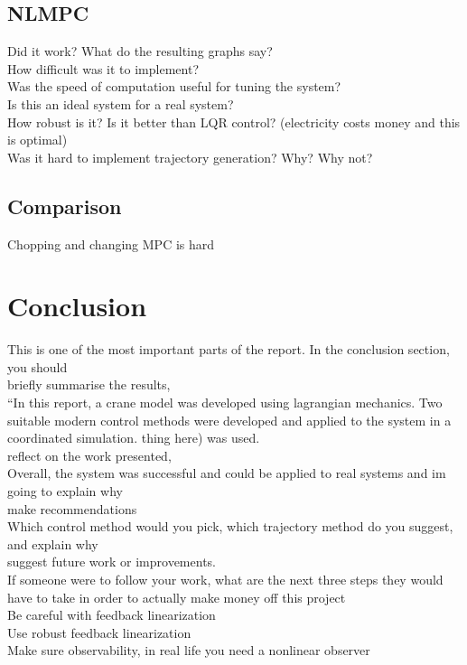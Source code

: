 \documentclass{UoNMCHA}
\numberwithin{equation}{section}
\begin{document}
\subsection{NLMPC}

Did it work? What do the resulting graphs say?\\
How difficult was it to implement?\\
Was the speed of computation useful for tuning the system? \\
Is this an ideal system for a real system?\\
How robust is it? Is it better than LQR control? (electricity costs money and this is optimal)\\
Was it hard to implement trajectory generation? Why? Why not?\\

\subsection{Comparison}

Chopping and changing MPC is hard

\section{Conclusion}
This is one of the most important parts of the report. In the conclusion section, you should \\
briefly summarise the results,\\
“In this report, a crane model was developed using lagrangian mechanics. Two suitable modern control methods were developed and applied to the system in a coordinated simulation. thing here) was used.\\  
reflect on the work presented,\\
Overall, the system was successful and could be applied to real systems and im going to explain why\\
make recommendations\\
Which control method would you pick, which trajectory method do you suggest, and explain why\\
suggest future work or improvements.\\

If someone were to follow your work, what are the next three steps they would have to take in order to actually make money off this project\\
Be careful with feedback linearization\\
Use robust feedback linearization\\
Make sure observability, in real life you need a nonlinear observer\\
\end{document}
